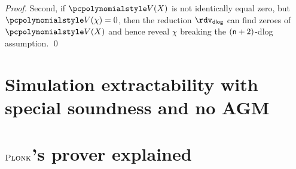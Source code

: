 \documentclass[runningheads,11pt]{llncs}
\theoremstyle{definition}
\begin{document}
\begin{proof}
	Second, if $\p{V}(X)$ is not identically equal zero, but $\p{V}(\chi) = 0$, then the reduction $\rdvdlog$ can find zeroes of $\p{V}(X)$ and hence reveal $\chi$ breaking the $(\mathsf{n} + 2)$-dlog assumption.
	\qed
\end{proof}

\section{Simulation extractability with special soundness and no AGM}



\appendix
\section{$\textsc{Plonk}$'s prover explained}
\label{sec:plonk_explained}

\paragraph{}
\end{document}
